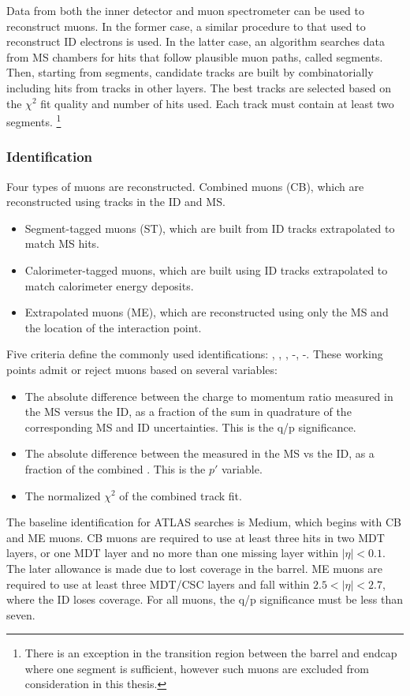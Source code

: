 Data from both the inner detector and muon spectrometer can be used to reconstruct muons.
In the former case, a similar procedure to that used to reconstruct ID electrons is used.
In the latter case, an algorithm searches data from MS chambers for hits that follow plausible muon paths, called segments.
Then, starting from segments, candidate tracks are built by combinatorially including hits from tracks in other layers.
The best tracks are selected based on the $\chi^2$ fit quality and number of hits used.
Each track must contain at least two segments.
\footnote{There is an exception in the transition region between the barrel and endcap where one segment is sufficient, however such muons are excluded from consideration in this thesis.}

\subsubsection{Identification}

Four types of muons are reconstructed.
Combined muons (CB), which are reconstructed using tracks in the ID and MS.
\begin{itemize}
\item Segment-tagged muons (ST), which are built from ID tracks extrapolated to match MS hits.
\item Calorimeter-tagged muons, which are built using ID tracks extrapolated to match calorimeter energy deposits.
\item Extrapolated muons (ME), which are reconstructed using only the MS and the location of the interaction point.
\end{itemize}

Five criteria define the commonly used identifications: , , , -\pt, -\pt.
These working points admit or reject muons based on several variables:
\begin{itemize}
    \item The absolute difference between the charge to momentum ratio measured in the MS versus the ID, as a fraction of the sum in quadrature of the corresponding MS and ID uncertainties. This is the q/p significance.
    \item The absolute difference between the \pt measured in the MS vs the ID, as a fraction of the combined \pt. This is the $p'$ variable.
    \item The normalized $\chi^2$ of the combined track fit.
\end{itemize}
The baseline identification for ATLAS searches is Medium, which begins with CB and ME muons.
CB muons are required to use at least three hits in two MDT layers, or one MDT layer and no more than one missing layer within $|\eta|<0.1$.
The later allowance is made due to lost coverage in the barrel.
ME muons are required to use at least three MDT/CSC layers and fall within $2.5<|\eta|<2.7$, where the ID loses coverage.
For all muons, the q/p significance must be less than seven.
\cite{muonReco}

